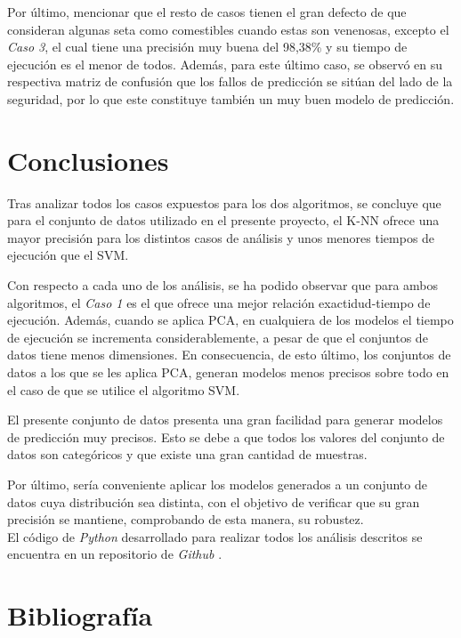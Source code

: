 \documentclass{Plantilla/Formato_EPEF}
\begin{document}
Por último, mencionar que el resto de casos tienen el gran defecto de que consideran algunas seta como comestibles cuando estas son venenosas, excepto el \textit{Caso 3}, el cual tiene una precisión muy buena del 98,38\% y su tiempo de ejecución es el menor de todos. Además, para este último caso, se observó en su respectiva matriz de confusión que los fallos de predicción se sitúan del lado de la seguridad, por lo que este constituye también un muy buen modelo de predicción.


\section{Conclusiones}
Tras analizar todos los casos expuestos para los dos algoritmos, se concluye que para el conjunto de datos utilizado en el presente proyecto, el K-NN ofrece una mayor precisión para los distintos casos de análisis y unos menores tiempos de ejecución que el SVM.

Con respecto a cada uno de los análisis, se ha podido observar que para ambos algoritmos, el \textit{Caso 1} es el que ofrece una mejor relación exactidud-tiempo de ejecución. Además, cuando se aplica PCA, en cualquiera de los modelos el tiempo de ejecución se incrementa considerablemente, a pesar de que el conjuntos de datos tiene menos dimensiones. En consecuencia, de esto último, los conjuntos de datos a los que se les aplica PCA, generan modelos menos precisos sobre todo en el caso de que se utilice el algoritmo SVM.

El presente conjunto de datos presenta una gran facilidad para generar modelos de predicción muy precisos. Esto se debe a que todos los valores del conjunto de datos son categóricos y que existe una gran cantidad de muestras. 

Por último, sería conveniente aplicar los modelos generados a un conjunto de datos cuya distribución sea distinta, con el objetivo de verificar que su gran precisión se mantiene, comprobando de esta manera, su robustez.
\\
El código de \textit{Python} desarrollado para realizar todos los análisis descritos se encuentra en un repositorio de \textit{Github} \cite{Guithub}.



	
	
	
	
\newpage
\section{Bibliografía}
\renewcommand{\NombreDocumento}{Bibliografía}


\end{document}

